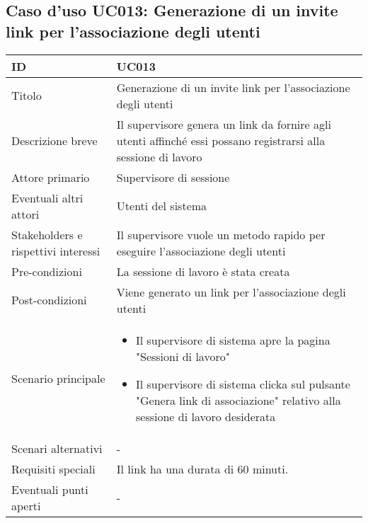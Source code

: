 \documentclass[../../main.tex]{subfiles}
\begin{document}
\subsection{Caso d’uso UC013: Generazione di un invite link per l'associazione degli utenti }
\begin{tabularx}{150mm}{|l|X|}
    \hline
    ID                                  & \textbf{UC013}\\
    \hline
    Titolo                              & Generazione di un invite link per l'associazione degli utenti \\
    \hline
    Descrizione breve                   & Il supervisore genera un link da fornire agli utenti affinché essi possano registrarsi alla sessione di lavoro   \\
    \hline
    Attore primario                     & Supervisore di sessione   \\
    \hline
    Eventuali altri attori              & Utenti del sistema   \\
    \hline
    Stakeholders e rispettivi interessi & Il supervisore vuole un metodo rapido per eseguire l'associazione degli utenti   \\
    \hline
    Pre-condizioni                      & La sessione di lavoro è stata creata   \\
    \hline
    Post-condizioni                     & Viene generato un link per l'associazione degli utenti   \\
    \hline
    Scenario principale                 & 
    \begin{itemize}
        \item Il supervisore di sistema apre la pagina "Sessioni di lavoro"
        \item Il supervisore di sistema clicka sul pulsante "Genera link di associazione" relativo alla sessione di lavoro desiderata
    \end{itemize} 
    \\
    \hline
    Scenari alternativi                 & -   \\
    \hline
    Requisiti speciali                  & Il link ha una durata di 60 minuti.  \\
    \hline
    Eventuali punti aperti              & -   \\
    \hline
\end{tabularx}
\newpage
\end{document}

